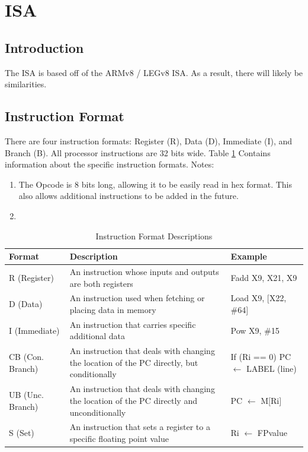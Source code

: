 \documentclass[letter,14pt]{article}
\begin{document}
\section{ISA}
\subsection{Introduction}
The ISA is based off of the ARMv8 / LEGv8 ISA. As a result, there will likely be similarities.

\subsection{Instruction Format}
There are four instruction formats: Register (R), Data (D), Immediate (I), and Branch (B). 
All processor instructions are 32 bits wide. Table \ref{table:format_descriptions} Contains information about the specific instruction formats.
\newline
\newline
Notes:
\begin{enumerate}
    \item The Opcode is 8 bits long, allowing it to be easily read in hex format. This also allows additional instructions to be added in the future.
    \item 
\end{enumerate}

\begin{table}[H]
\centering
\caption{Instruction Format Descriptions}
\label{table:format_descriptions}
\begin{tabular}{| l | p{7cm} | l |}
\hline
Format & Description & Example \\ \hline
R (Register) & An instruction whose inputs and outputs are both registers & Fadd X9, X21, X9 \\ \hline
D (Data) & An instruction used when fetching or placing data in memory & Load X9, {[}X22, \#64{]} \\ \hline
I (Immediate) & An instruction that carries specific additional data & Pow X9, \#15 \\ \hline
CB (Con. Branch) & An instruction that deals with changing the location of the PC directly, but conditionally & If (Ri == 0) PC $\leftarrow$  LABEL (line) \\ \hline
UB (Unc. Branch) & An instruction that deals with changing the location of the PC directly and unconditionally & PC $\leftarrow$  M[Ri] \\ \hline
S (Set) & An instruction that sets a register to a specific floating point value & Ri $\leftarrow$  FPvalue \\ \hline
\end{tabular}
\end{table}
\end{document}
